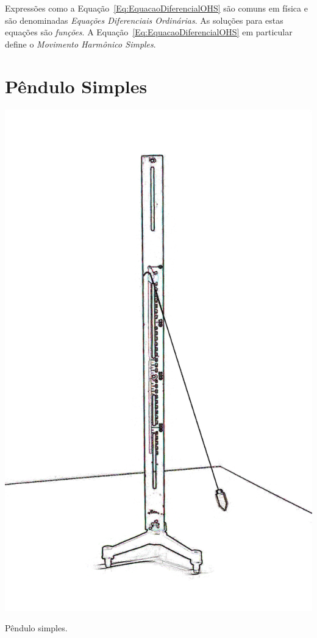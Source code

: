 Expressões como a Equação~\eqref{Eq:EquacaoDiferencialOHS} são comuns em física e são denominadas \emph{Equações Diferenciais Ordinárias}. As soluções para estas equações são \emph{funções}. A Equação~\eqref{Eq:EquacaoDiferencialOHS} em particular define o \emph{Movimento Harmônico Simples}.

\section{Pêndulo Simples}

\begin{marginfigure}[-3cm]
	\centering
	\includegraphics[width=\textwidth]{Ilustrations/Pendulo_simples.png}
	\caption{Pêndulo simples.}
\end{marginfigure}

